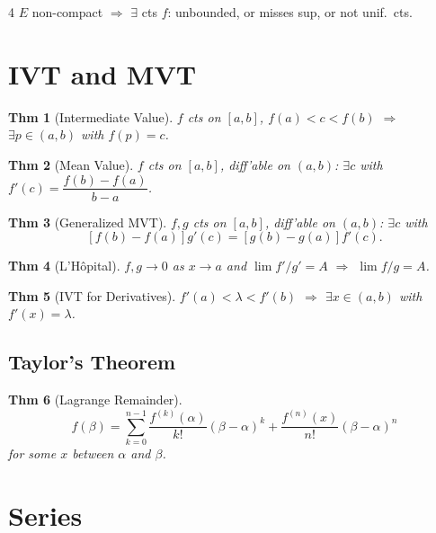 \documentclass[9pt,landscape]{extarticle}
\theoremstyle{compact}
\newtheorem*{thm}{Thm}
\theoremstyle{defnstyle}
\begin{document}
\begin{multicols}{4}
$E$ non-compact $\Rightarrow$ $\exists$ cts $f$: unbounded, or misses sup, or not unif.\ cts.

\section{IVT and MVT}

\begin{highlight}
\begin{thm}[Intermediate Value]
$f$ cts on $[a,b]$, $f(a) < c < f(b)$ $\Rightarrow$ $\exists p \in (a,b)$ with $f(p) = c$.
\end{thm}
\begin{thm}[Mean Value]
$f$ cts on $[a,b]$, diff'able on $(a,b)$: $\exists c$ with $f'(c) = \dfrac{f(b)-f(a)}{b-a}$.
\end{thm}
\end{highlight}

\begin{thm}[Generalized MVT]
$f, g$ cts on $[a,b]$, diff'able on $(a,b)$: $\exists c$ with
$$[f(b)-f(a)]g'(c) = [g(b)-g(a)]f'(c).$$
\end{thm}

\begin{thm}[L'H\^opital]
$f,g \to 0$ as $x \to a$ and $\lim f'/g' = A$ $\Rightarrow$ $\lim f/g = A$.
\end{thm}

\begin{thm}[IVT for Derivatives]
$f'(a) < \lambda < f'(b)$ $\Rightarrow$ $\exists x \in (a,b)$ with $f'(x) = \lambda$.
\end{thm}

\subsection{Taylor's Theorem}
\begin{thm}[Lagrange Remainder]
$$f(\beta) = \sum_{k=0}^{n-1}\frac{f^{(k)}(\alpha)}{k!}(\beta-\alpha)^k + \frac{f^{(n)}(x)}{n!}(\beta-\alpha)^n$$
for some $x$ between $\alpha$ and $\beta$.
\end{thm}

\section{Series}


\end{multicols}
\end{document}
